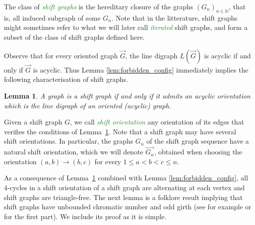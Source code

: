 \documentclass[11pt,a4aper]{article}
\newtheorem{lemma}[theorem]{Lemma}
\renewcommand{\leq}{\leqslant}
\DeclareRobustCommand*{\ora}{\overrightarrow}
\newcommand*{\orG}{\ora{G}}
\newcommand*{\orGn}{\ora{G_n}}
\newcommand{\defin}[1]{\emph{\textcolor{ForestGreen}{#1}}}
\newcommand{\clement}[1]{{\color{orange} CL: #1}}
\newcommand{\ugo}[1]{{\color{red} UG: #1}}
\begin{document}
The class of \defin{shift graphs} is the hereditary closure of the graphs
$(G_{n})_{n\in \mathbb{N}}$, that is, all induced subgraph of some $G_{n}$. Note
that in the litterature, shift graphs might sometimes refer to what we will
later call
\defin{iterated} shift graphs, and form a subset of
the class of shift graphs defined here.

Observe that for every oriented graph $\orG$, the line digraph $L(\orG)$ is acyclic if
and only if $\orG$ is acyclic.
Thus Lemma \ref{lem:forbidden_config} immediately implies
the following characterisation of shift graphs.
\begin{lemma}\label{lem:valid}
  A graph is a shift graph if and only if it admits an acyclic
  orientation which is the line digraph of an oriented (acyclic) graph.
\end{lemma}
Given a shift graph $G$, we call \defin{shift orientation} any orientation of
its edges that verifies the conditions of Lemma~\ref{lem:valid}. Note that a shift graph
may have several shift orientations. In particular, the graphs $G_n$ of the shift
graph sequence have a natural shift orientation, which we will denote $\orGn$,
obtained when choosing the orientation $(a,b)\to(b,c)$
for every $1\leq a<b<c\leq n$.

As a consequence of Lemma~\ref{lem:valid} combined with Lemma \ref{lem:forbidden_config}, all 4-cycles in a shift orientation of a
shift graph are alternating at each vertex and shift graphs are
triangle-free. The next lemma is a folklore result implying that shift graphs have unbounded chromatic number and odd girth (see for example \cite[Theorem
4]{harner1972Arc} or \cite[Lemma 2.21]{GraphsandHomomorphisms} for the first
part). We include its proof as it is simple.
\end{document}

